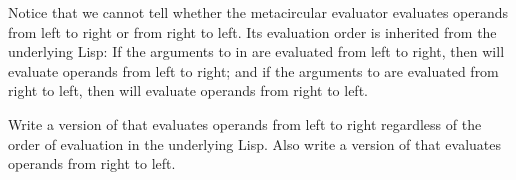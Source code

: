 \begin{exercise}
\label{Exercise 4.1}
	Notice that we cannot tell whether the metacircular evaluator evaluates operands from left to right or from right to left.
	Its evaluation order is inherited from the underlying Lisp:
	If the arguments to  in  are evaluated from left to right, then  will evaluate operands from left to right;
	and if the arguments to  are evaluated from right to left, then  will evaluate operands from right to left.

	Write a version of  that evaluates operands from left to right regardless of the order of evaluation in the underlying Lisp.
	Also write a version of  that evaluates operands from right to left.
\end{exercise}
